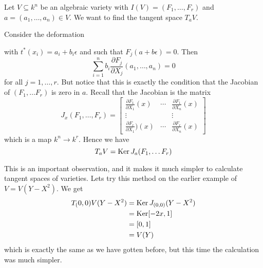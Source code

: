 \begin{example}
Let $V\subseteq k^n$ be an algebraic variety with $I(V) = (F_1, \ldots, F_r)$ and $a=(a_1, \ldots, a_n)\in V$. We want to find the tangent space $T_a V$. 

Consider the deformation 
\begin{center}
\end{center}
with $t^*(x_i) = a_i+b_i\epsilon$ and such that $F_j(a+b\epsilon)=0$. Then
\begin{equation*}
    \sum_{i=1}^n b_i \frac{\partial F_j}{\partial X_j}(a_1, \ldots, a_n) = 0
\end{equation*}
for all $j=1,\ldots, r$. But notice that this is exactly the condition that the Jacobian of $(F_1, \ldots F_r)$ is zero in $a$. Recall that the Jacobian is the matrix 
\begin{equation*}
J_x(F_1, \ldots, F_r) = 
\begin{bmatrix}
\frac{\partial F_1}{\partial X_1}(x) &\cdots &\frac{\partial F_1}{\partial X_n}(x) \\
\vdots      &       & \vdots \\
\frac{\partial F_r}{\partial X_1})(x) &\cdots   &\frac{\partial F_r}{\partial X_n}(x)
\end{bmatrix}
\end{equation*}
which is a map $k^n\longrightarrow k^r$. Hence we have 
\begin{equation*}
    T_a V = \operatorname{Ker} J_a(F_1, \ldots F_r)
\end{equation*}
\end{example}

This is an important observation, and it makes it much simpler to calculate tangent spaces of varieties. Lets try this method on the earlier example of $V = V(Y-X^2)$. We get
\begin{align*}
    T_(0,0) V(Y-X^2) 
    &= \operatorname{Ker} J_{(0,0)}(Y-X^2) \\
    &= \operatorname{Ker} [-2x, 1] \\
    &= [0,1] \\
    &= V(Y)
\end{align*}
which is exactly the same as we have gotten before, but this time the calculation was much simpler. 

